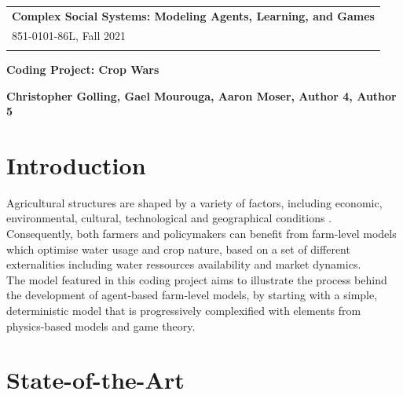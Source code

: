 \documentclass[a4paper,12pt]{article} %
\begin{document}
\thispagestyle{empty}
\begin{tabular}{p{15.5cm}}
{\bf Complex Social Systems: Modeling Agents, Learning, and Games} \\
851-0101-86L, Fall 2021  \\
\hline \\
\end{tabular}
\vspace*{0.3cm}
\begin{center}
	{\Large \bf Coding Project: Crop Wars}
	\vspace{2mm}
        
	{\bf Christopher Golling, Gael Mourouga, Aaron Moser, Author 4, Author 5 }
		
\end{center}  

\vspace{0.4cm}

\section{Introduction}

Agricultural structures are shaped by a variety of factors, including economic, environmental, cultural, technological and geographical conditions \cite{happeAgriculturalPoliciesFarm2004}. \\
Consequently, both farmers and policymakers can benefit from farm-level models which optimise water usage and crop nature, based on a set of different externalities including water ressources availability and market dynamics.\\
The model featured in this coding project aims to illustrate the process behind the development of agent-based farm-level models, by starting with a simple, deterministic model that is progressively complexified with elements from physics-based models and game theory.


\section{State-of-the-Art}
\end{document}
